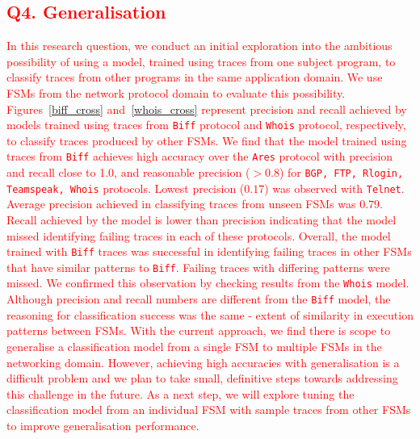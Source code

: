 \iffalse
\textcolor{red}{\subsection{Q4. Generalisation}
\label{sec:q4}
In this research question, we conduct an initial exploration into the ambitious possibility of using a model, trained using traces from one subject program, to classify traces from other programs in the same application domain. We use FSMs from the network protocol domain to evaluate this possibility. Figures~\ref{biff_cross} and~\ref{whois_cross} represent precision and recall achieved by models trained using traces from \texttt{Biff} protocol and \texttt{Whois} protocol, respectively, to classify traces produced by other FSMs.
We find that the model trained using traces from \texttt{Biff} achieves high accuracy over the \texttt{Ares} protocol with precision and recall close to 1.0, and reasonable
precision ($ > 0.8$) for \texttt{BGP, FTP, Rlogin, Teamspeak, Whois} protocols. Lowest precision ($0.17$) was observed with \texttt{Telnet}. Average precision achieved in classifying traces from unseen FSMs was $0.79$.
Recall achieved by the model is lower than precision indicating that the model missed identifying failing traces in each of these protocols.  
Overall, the model trained with \texttt{Biff} traces was successful in identifying failing traces in other FSMs that have similar patterns to \texttt{Biff}. Failing traces with differing patterns were missed.  
We confirmed this observation by checking results from the \texttt{Whois} model. Although precision and recall numbers are different from the \texttt{Biff} model, the reasoning for classification success was the same - extent of similarity in execution patterns between FSMs.
With the current approach, we find there is scope to generalise a classification model from a single FSM to multiple FSMs in the networking domain. However, achieving high accuracies with generalisation is a difficult problem and we plan to take small, definitive steps towards addressing this challenge in the future. As a next step, we will explore tuning the classification model from an individual FSM with sample traces from other FSMs to improve generalisation performance.  %
}


